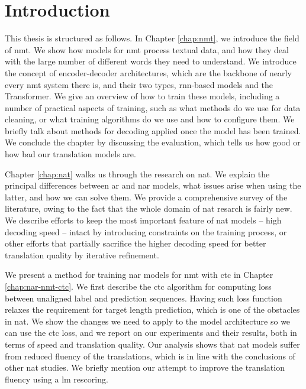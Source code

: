 \chapter{Introduction}
\label{chap:intro}


This thesis is structured as follows.
%
In Chapter \ref{chap:nmt}, we introduce the field of \ac{nmt}. We show how
models for \ac{nmt} process textual data, and how they deal with the large
number of different words they need to understand. We introduce the concept of
encoder-decoder architectures, which are the backbone of nearly every \ac{nmt}
system there is, and their two types, \acs{rnn}-based models and the
Transformer. We give an overview of how to train these models, including a
number of practical aspects of training, such as what methods do we use for
data cleaning, or what training algorithms do we use and how to configure
them. We briefly talk about methods for decoding applied once the model has
been trained. We conclude the chapter by discussing the evaluation, which tells
us how good or how bad our translation models are.

Chapter \ref{chap:nat} walks us through the research on \ac{nat}. We explain
the principal differences between \acl{ar} and \acl{nar} models, what issues
arise when using the latter, and how we can solve them. We provide a
comprehensive survey of the literature, owing to the fact that the whole domain
of \ac{nat} resarch is fairly new. We describe efforts to keep the most
important feature of \ac{nat} models -- high decoding speed -- intact by
introducing constraints on the training process, or other efforts that
partially sacrifice the higher decoding speed for better translation quality by
iterative refinement. 

We present a method for training \acl{nar} models for \ac{nmt} with \ac{ctc} in
Chapter \ref{chap:nar-nmt-ctc}. We first describe the \ac{ctc} algorithm for
computing loss between unaligned label and prediction sequences. Having such
loss function relaxes the requirement for target length prediction, which is
one of the obstacles in \ac{nat}. We show the changes we need to apply to the
model architecture so we can use the \ac{ctc} loss, and we report on our
experiments and their results, both in terms of speed and translation quality.
Our analysis shows that \ac{nat} models suffer from reduced fluency of the
translations, which is in line with the conclusions of other \ac{nat} studies.
We briefly mention our attempt to improve the translation fluency using a
\acl{lm} rescoring.



